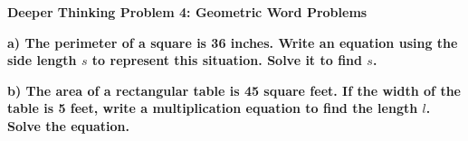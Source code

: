 \documentclass[12pt, letterpaper, fleqn]{article}
\begin{document}
\begin{tcolorbox}[colback=black!5, colframe=black!50, boxrule=1pt, arc=4mm, left=6mm, right=6mm, top=5mm, bottom=5mm]
\textbf{Deeper Thinking Problem 4: Geometric Word Problems}

\medskip

\noindent
\textbf{a) The perimeter of a square is 36 inches. Write an equation using the side length $s$ to represent this situation. Solve it to find $s$.}

\vspace{2.5cm}

\noindent
\textbf{b) The area of a rectangular table is 45 square feet. If the width of the table is 5 feet, write a multiplication equation to find the length $l$. Solve the equation.}

\vspace{2.5cm}
\end{tcolorbox}
\end{document}
